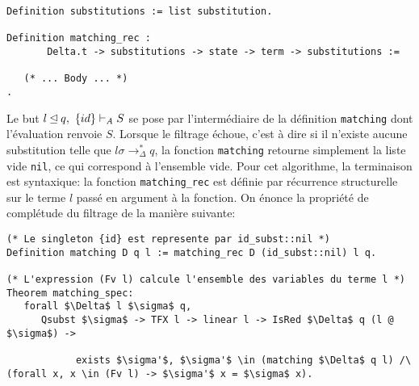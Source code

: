 \begin{lstlisting}
Definition substitutions := list substitution.

Definition matching_rec :
       Delta.t -> substitutions -> state -> term -> substitutions :=

   (* ... Body ... *)
.
\end{lstlisting}
Le but $l\unlhd q,\ \{id\} \vdash_\mathit A S$ se pose par l'intermédiaire de 
la définition \lstinline!matching! dont l'évaluation renvoie $S$.
Lorsque le filtrage échoue, c'est à dire si il n'existe aucune substitution
telle que $l\sigma \rightarrow_\Delta^* q$, la fonction \lstinline!matching! retourne
simplement la liste vide \lstinline!nil!, ce qui correspond à l'ensemble vide.
Pour cet algorithme, la terminaison est syntaxique: la fonction \lstinline!matching_rec! est définie par récurrence 
structurelle sur le terme $l$ passé en argument à la fonction.
On énonce la propriété de complétude du filtrage de la manière suivante:
\begin{lstlisting}
(* Le singleton {id} est represente par id_subst::nil *)
Definition matching D q l := matching_rec D (id_subst::nil) l q.

(* L'expression (Fv l) calcule l'ensemble des variables du terme l *)
Theorem matching_spec:
   forall $\Delta$ l $\sigma$ q,
      Qsubst $\sigma$ -> TFX l -> linear l -> IsRed $\Delta$ q (l @ $\sigma$) ->

            exists $\sigma'$, $\sigma'$ \in (matching $\Delta$ q l) /\ (forall x, x \in (Fv l) -> $\sigma'$ x = $\sigma$ x).
\end{lstlisting}

